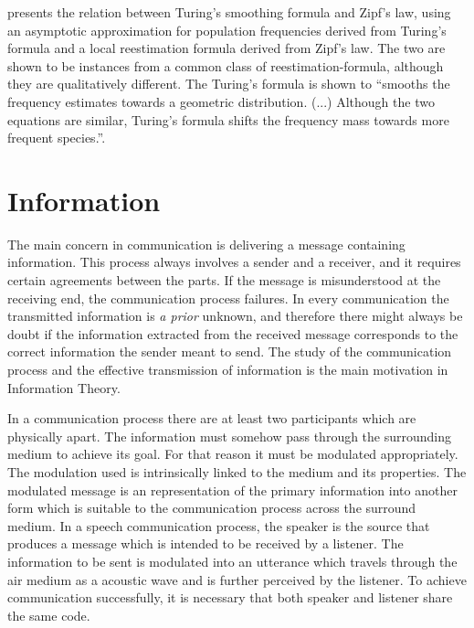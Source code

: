 \cite{samuelsson1996} presents the relation between Turing's smoothing formula
and Zipf's law, using an asymptotic approximation for population frequencies
derived from Turing's formula and a local reestimation formula derived from 
Zipf's law. The two are shown to be instances from a common class of reestimation-formula,
although they are qualitatively different. The Turing's formula is shown to ``smooths
the frequency estimates towards a geometric distribution. (...) Although the two equations  
are similar, Turing's formula shifts the frequency mass towards more frequent species.''. 











\section{Information}
The main concern in communication is delivering a message containing information.
This process always involves a sender and a receiver, and it requires certain agreements 
between the parts. If the message is misunderstood at the receiving end, the communication process failures.
In every communication the transmitted information is \textit{a prior} unknown, and therefore there might
always be doubt if the information extracted from the received message corresponds to the correct 
information the sender meant to send. The study of the communication process and the effective transmission
of information is the main motivation in Information Theory.

In a communication process there are at least two participants which are physically apart. 
The information must somehow pass through the surrounding medium to achieve its goal. For that reason
it must be modulated appropriately. The modulation used is intrinsically linked to the medium 
and its properties.
The modulated message is an representation of the primary information into another form which is
suitable to the communication process across the surround medium.
In a speech communication process, the speaker is the source that produces a message which is 
intended to be received by a listener. The information to be sent is modulated into an utterance
which travels through the air medium as a acoustic wave and is further perceived by the listener.
To achieve communication successfully, it is necessary that both speaker and listener share
the same code.

